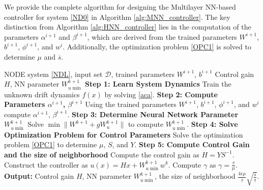 \documentclass[journal,twoside,web]{ieeecolor}
\begin{document}
We provide the complete algorithm for designing the Multilayer NN-based controller for system \eqref{ND0} in Algorithm \ref{alg:MNN_controller}. The key distinction from Algorithm \ref{alg:HNN_controller} lies in the computation of the parameters $\alpha^{i+1}$ and $\beta^{i+1}$, which are derived from the trained parameters $W^{i+1}$, $b^{i+1}$, $\phi^{i+1}$, and $w^i$. Additionally, the optimization problem \eqref{OPC1} is solved to determine $\mu$ and $\overline{s}$.
\begin{algorithm}[H]
\caption{Multilayer Neural Network Based Controller Design}
\label{alg:MNN_controller}
\begin{algorithmic}[1]
\REQUIRE NODE system \eqref{NDL}, input set $\mathcal{D}$, trained parameters $W^{i+1}$, $b^{i+1}$
\ENSURE Control gain $H$, NN parameter $W_{u\min}^{k+1}$
\vspace{0.5em}
\STATE \textbf{Step 1: Learn System Dynamics}
\STATE Train the unknown drift dynamics $f(x)$ by solving \eqref{aca}.
\STATE \textbf{Step 2: Compute Parameters $\alpha^{i+1}$, $\beta^{i+1}$}
\STATE Using the trained parameters $W^{i+1}$, $b^{i+1}$, $\phi^{i+1}$, and $w^{i}$ compute $\alpha^{i+1}$, $\beta^{i+1}$.
\STATE \textbf{Step 3: Determine Neural Network Parameter $W_{u\min}^{k+1}$}
\STATE Solve $\min \|W^{k+1} +gW_u^{k+1}\|$ to compute $W_{u\min}^{k+1}$.
\STATE \textbf{Step 4: Solve Optimization Problem for Control Parameters}
\STATE Solve the optimization problem \eqref{OPC1} to determine $\mu$, $S$, and $Y$.
\STATE \textbf{Step 5: Compute Control Gain and the size of neighborhood}
\STATE Compute the control gain as $H = YS^{-1}$.
\STATE Construct the controller as $u(x)=Hx+W_{u\min}^{k+1}w^k$.
\STATE Compute $\gamma$ as $\gamma=\frac{\underline{s}}{\mu}$.
\STATE \textbf{Output:} Control gain $H$, NN parameter $W_{u\min}^{k+1}$, the size of neighborhood $\frac{4\epsilon \mu}{\underline{s}}\sqrt{\frac{\overline{s}}{\underline{s}}}$.
\end{algorithmic}
\end{algorithm}
\end{document}
